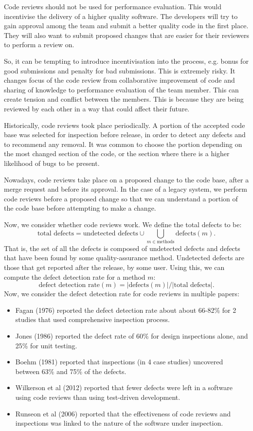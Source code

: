 \documentclass[a4paper, openany]{memoir}
\begin{document}
Code reviews should not be used for performance evaluation. This would incentivise the delivery of a higher quality software. The developers will try to gain approval among the team and submit a better quality code in the first place. They will also want to submit proposed changes that are easier for their reviewers to perform a review on. 

So, it can be tempting to introduce incentivisation into the process, e.g. bonus for good submissions and penalty for bad submissions. This is extremely risky. It changes focus of the code review from collaborative improvement of code and sharing of knowledge to performance evaluation of the team member. This can create tension and conflict between the members. This is because they are being reviewed by each other in a way that could affect their future.

Historically, code reviews took place periodically. A portion of the accepted code base was selected for inspection before release, in order to detect any defects and to recommend any removal. It was common to choose the portion depending on the most changed section of the code, or the section where there is a higher likelihood of bugs to be present.

Nowadays, code reviews take place on a proposed change to the code base, after a merge request and before its approval. In the case of a legacy system, we perform code reviews before a proposed change so that we can understand a portion of the code base before attempting to make a change.

Now, we consider whether code reviews work. We define the total defects to be:
\[\text{total defects} = \text{undetected defects} \cup \bigcup_{m \in \text{methods}} \text{defects}(m).\]
That is, the set of all the defects is composed of undetected defects and defects that have been found by some quality-assurance method. Undetected defects are those that get reported after the release, by some user. Using this, we can compute the defect detection rate for a method $m$:
\[\text{defect detection rate}(m) = |\text{defects}(m)|/|\text{total defects}|.\]
Now, we consider the defect detection rate for code reviews in multiple papers:
\begin{itemize}
    \item Fagan (1976) reported the defect detection rate about about 66-82\% for 2 studies that used comprehensive inspection process.
    \item Jones (1986) reported the defect rate of 60\% for design inspections alone, and 25\% for unit testing.
    \item Boehm (1981) reported that inspections (in 4 case studies) uncovered between 63\% and 75\% of the defects.
    \item Wilkerson et al (2012) reported that fewer defects were left in a software using code reviews than using test-driven development.
    \item Runseon et al (2006) reported that the effectiveness of code reviews and inspections was linked to the nature of the software under inspection.
\end{itemize}
\end{document}
